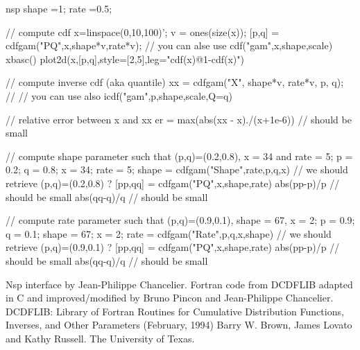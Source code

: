 \begin{examples}
\begin{mintednsp}{nsp}
shape =1;
rate =0.5;

// compute cdf
x=linspace(0,10,100)';
v = ones(size(x));
[p,q] = cdfgam("PQ",x,shape*v,rate*v); // you can alse use  cdf("gam",x,shape,scale)
xbasc()
plot2d(x,[p,q],style=[2,5],leg="cdf(x)@1-cdf(x)")

// compute inverse cdf (aka quantile)
xx = cdfgam("X", shape*v, rate*v, p, q); //  // you can use also icdf("gam",p,shape,scale,Q=q)

// relative error between x and xx 
er = max(abs(xx - x)./(x+1e-6))     // should be small


// compute shape parameter such that (p,q)=(0.2,0.8), x = 34 and rate = 5;
p = 0.2; q = 0.8; x = 34; rate = 5;
shape = cdfgam("Shape",rate,p,q,x)
// we should retrieve (p,q)=(0.2,0.8) ?
[pp,qq] = cdfgam("PQ",x,shape,rate)
abs(pp-p)/p    // should be small
abs(qq-q)/q    // should be small


// compute rate parameter such that (p,q)=(0.9,0.1), shape = 67, x = 2;
p = 0.9; q = 0.1; shape = 67; x = 2;  
rate = cdfgam("Rate",p,q,x,shape)
// we should retrieve (p,q)=(0.9,0.1) ?
[pp,qq] = cdfgam("PQ",x,shape,rate)
abs(pp-p)/p    // should be small
abs(qq-q)/q    // should be small

\end{mintednsp}
%

\end{examples}

\begin{authors}
  Nsp interface by Jean-Philippe Chancelier. Fortran code from DCDFLIB
  adapted in C and improved/modified by Bruno Pincon and Jean-Philippe Chancelier.  
  DCDFLIB: Library of Fortran Routines for Cumulative Distribution
  Functions, Inverses, and Other Parameters (February, 1994)
  Barry W. Brown, James Lovato and Kathy Russell. The University of Texas.

\end{authors}
